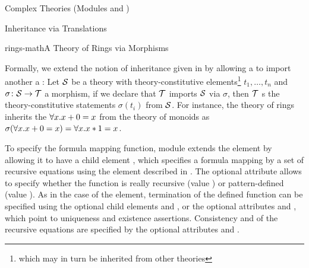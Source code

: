 \begin{tchapter}[id=complex-theories,short=Complex Theories]{Complex Theories (Modules
    {} and {})}
\begin{tsection}[id=morphisms]{Inheritance via Translations}
\begin{myfig}{rings-math}{A Theory of Rings via Morphisms}
{}
\end{myfig}

Formally, we extend the notion of inheritance given in {} by
allowing a {} to import another a {}
{}: Let ${\cal S}$ be a theory with theory-constitutive
elements\footnote{which may in turn be inherited from other theories} $t_1,\ldots,t_n$ and
$\sigma\colon{\cal S}\to{\cal T}$ a morphism, if we declare that ${\cal T}$ imports ${\cal S}$ via $\sigma$,
then ${\cal T}$ {s} the theory-constitutive statements $\sigma(t_i)$ from
${\cal S}$. For instance, the theory of rings inherits the {}
${\forall{x}.{x+0=x}}$ from the theory of monoids as
$\sigma({\forall{x}.{x+0=x}})={\forall{x}.{x*1=x}}$.

To specify the formula mapping function, module {} extends the
{} element by allowing it to have a child element {},
which specifies a formula mapping by a set of recursive equations using the
{} element described in {}. The optional
attribute {} allows to specify whether the function is really
recursive (value {}) or pattern-defined (value
{}). As in the case of the {} element,
termination of the defined function can be specified using the optional child elements
{} and {}, or the optional attributes
{} and {}, which point to
uniqueness and existence assertions. Consistency{} and
{} of the recursive equations are specified by the optional
attributes {} and {}.


\end{tsection}
\end{tchapter}
